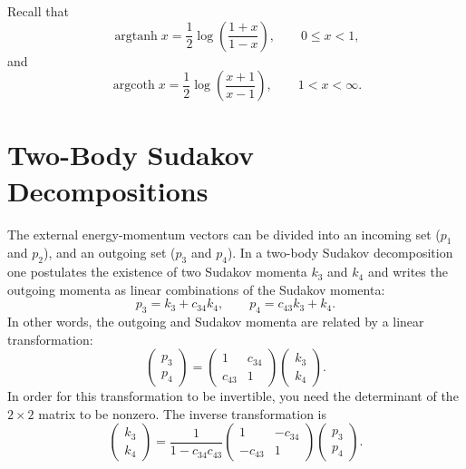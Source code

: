 Recall that
\begin{equation}
	\operatorname{argtanh}{x} = \frac{1}{2} \log{\left( \frac{1 + x}{1 - x} \right)}, \qquad 0 \leq x < 1,
\end{equation}
and
\begin{equation}
	\operatorname{argcoth}{x} = \frac{1}{2} \log{\left( \frac{x + 1}{x - 1} \right)}, \qquad 1 < x < \infty.
\end{equation}
\section{Two-Body Sudakov Decompositions}
The external energy-momentum vectors can be divided into an incoming set ($p_{1}$ and $p_{2}$), and an outgoing set ($p_{3}$ and $p_{4}$). In a two-body Sudakov decomposition one postulates the existence of two Sudakov momenta $k_{3}$ and $k_{4}$ and writes the outgoing momenta as linear combinations of the Sudakov momenta:
\begin{equation}
	p_{3} = k_{3} + c_{34} k_{4}, \qquad p_{4} = c_{43} k_{3} + k_{4}.
\end{equation}
In other words, the outgoing and Sudakov momenta are related by a linear transformation:
\begin{equation}
	\begin{pmatrix} p_{3} \\
	p_{4} \end{pmatrix} = \begin{pmatrix} 1 & c_{34} \\
	c_{43} & 1 \end{pmatrix} \begin{pmatrix} k_{3} \\
	k_{4} \end{pmatrix}.
\end{equation}
In order for this transformation to be invertible, you need the determinant of the $2 \times 2$ matrix to be nonzero. The inverse transformation is
\begin{equation}
	\begin{pmatrix} k_{3} \\
	k_{4} \end{pmatrix} = \frac{1}{1 - c_{34} c_{43}} \begin{pmatrix} 1 & -c_{34} \\
	-c_{43} & 1 \end{pmatrix} \begin{pmatrix} p_{3} \\
	p_{4} \end{pmatrix}.
\end{equation}
